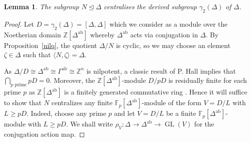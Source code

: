 \documentclass{amsart}
\numberwithin{theorem}{section}
\numberwithin{equation}{section}
\newtheorem{lemma}[theorem]{Lemma}
\newcommand{\Z}{\mathbb{Z}}
\begin{document}
\begin{lemma} \label{centralizer} The subgroup $N \trianglelefteq \Delta$ centralises the derived subgroup $\gamma_2(\Delta)$ of $\Delta$.
\end{lemma}
\begin{proof}
Let $D= \gamma_2(\Delta) = [\Delta, \Delta]$ which we consider as a module over the Noetherian domain $ \Z[\Delta^\mathrm{ab}]$ whereby $\Delta^\mathrm{ab}$ acts via conjugation in $\Delta$. By Proposition~\ref{nilq}, the quotient $\Delta / N$ is cyclic, so we may choose an element $\zeta \in \Delta$ such that $\langle N,\zeta\rangle = \Delta$.

As $\Delta / D \cong \Delta^\mathrm{ab} \cong \Gamma^\mathrm{ab} \cong \Z^n$ is nilpotent, a classic result of P. Hall implies \cite[Exercise 15.4.2]{Robinson1996} that $\bigcap_{p \textrm{ prime}}pD = 0$. Moreover, the $\Z[\Delta^\mathrm{ab}]$-module $D/pD$ is residually finite for each prime $p$ as $\Z[\Delta^\mathrm{ab}]$ is a finitely generated commutative ring \cite[Theorem 1]{Orzech1970}. Hence it will suffice to show that $N$ centralizes any finite $\mathbb F_p[\Delta^\mathrm{ab}]$-module of the form $V= D/L$ with $L \geq pD$. Indeed, choose any prime $p$ and let $V = D / L$ be a finite $\mathbb{F}_p[\Delta^\mathrm{ab}]$-module with $L \geq pD$. We shall write $\rho_V \colon \Delta \to \Delta^\mathrm{ab} \to \operatorname{GL}(V)$ for the conjugation action map.


\end{proof}
\end{document}

